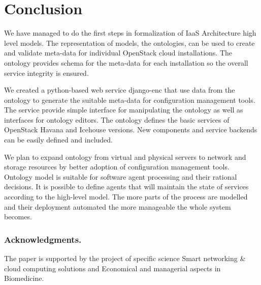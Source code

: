 
\section{Conclusion}

We have managed to do the first steps in formalization of IaaS Architecture high level models. The representation of models, the ontologies, can be used to create and validate meta-data for individual OpenStack cloud installations. The ontology provides schema for the meta-data for each installation so the overall service integrity is ensured.

We created a python-based web service django-enc that use data from the ontology to generate the suitable meta-data for configuration management tools. The service provide simple interface for manipulating the ontology as well as interfaces for ontology editors. The ontology defines the basic services of OpenStack Havana and Icehouse versions. New components and service backends can be easily defined and included.



We plan to expand  ontology from virtual and physical servers to network and storage resources by better adoption of configuration management tools. Ontology model is suitable for software agent processing and their rational decisions. It is possible to define agents that will maintain the state of services according to the high-level model. The more parts of the process are modelled and their deployment automated the more manageable the whole system becomes.

\subsubsection*{Acknowledgments.}
 
The paper is supported by the project of specific science Smart networking \& cloud computing solutions and Economical and managerial aspects in Biomedicine.
